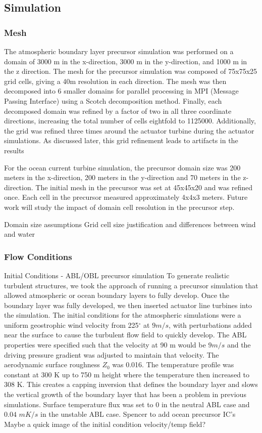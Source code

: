 \subsection{Simulation}


\subsubsection{Mesh}

The atmospheric boundary layer precursor simulation was performed on a domain of 3000 m in the x-direction, 3000 m in the y-direction, and 1000 m in the z direction.  The mesh for the precursor simulation was composed of 75x75x25 grid cells, giving a 40m resolution in each direction.  The mesh was then decomposed into 6 smaller domains for parallel processing in MPI (Message Passing Interface) using a Scotch decomposition method.  Finally, each decomposed domain was refined by a factor of two in all three coordinate directions, increasing the total number of cells eightfold to 1125000.  Additionally, the grid was refined three times around the actuator turbine during the actuator simulations.  As discussed later, this grid refinement leads to artifacts in the results  

For the ocean current turbine simulation, the precursor domain size was 200 meters in the x-direction, 200 meters in the y-direction and 70 meters in the z-direction. The initial mesh in the precursor was set at 45x45x20 and was refined once. Each cell in the precursor measured approximately 4x4x3 meters. Future work will study the impact of domain cell resolution in the precursor step.


Domain size assumptions
Grid cell size justification and differences between wind and water

\subsubsection{Flow Conditions}

Initial Conditions - ABL/OBL precursor simulation
To generate realistic turbulent structures, we took the approach of running a precursor simulation that allowed atmospheric or ocean boundary layers to fully develop.  Once the boundary layer was fully developed, we then inserted actuator line turbines into the simulation.  The initial conditions for the atmospheric simulations were a uniform geostrophic wind velocity from 225$^\circ$  at $9 m/s$, with perturbations added near the surface to cause the turbulent flow field to quickly develop.  The ABL properties were specified such that the velocity at 90 m would be $9 m/s$ and the driving pressure gradient was adjusted to maintain that velocity.  The aerodynamic surface roughness $Z_{0}$ was 0.016.  The temperature profile was constant at 300 K up to 750 m height where the temperature then increased to 308 K.  This creates a capping inversion that defines the boundary layer and slows the vertical growth of the boundary layer that has been a problem in previous simulations.  Surface temperature flux was set to 0 in the neutral ABL case and $0.04$ $mK/s$ in the unstable ABL case.
%
Spencer to add ocean precursor IC's
Maybe a quick image of the initial condition velocity/temp field?

